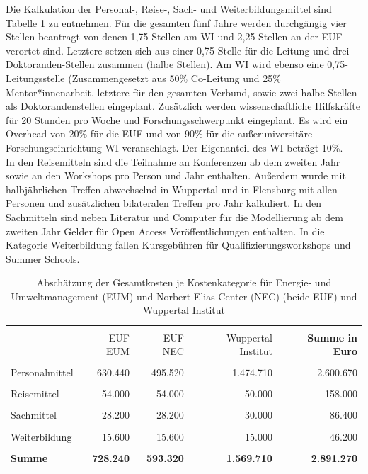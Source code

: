\documentclass[a4paper,11pt,twoside]{scrartcl}
\begin{document}
Die Kalkulation der Personal-, Reise-, Sach- und Weiterbildungsmittel sind Tabelle \ref{tab:kostenkalkulation} zu entnehmen. Für die gesamten fünf Jahre werden durchgängig vier Stellen beantragt von denen 1,75 Stellen am WI und 2,25 Stellen an der EUF verortet sind. Letztere setzen sich aus einer 0,75-Stelle für die Leitung und drei Doktoranden-Stellen zusammen (halbe Stellen). Am WI wird ebenso eine 0,75-Leitungsstelle (Zusammengesetzt aus 50\% Co-Leitung und 25\% Mentor*innenarbeit, letztere für den gesamten Verbund, sowie zwei halbe Stellen als Doktorandenstellen eingeplant. Zusätzlich werden wissenschaftliche Hilfskräfte für 20 Stunden pro Woche und Forschungsschwerpunkt eingeplant. Es wird ein Overhead von 20\% für die EUF und von 90\% für die außeruniversitäre Forschungseinrichtung WI veranschlagt. Der Eigenanteil des WI beträgt 10\%.\\
In den Reisemitteln sind die Teilnahme an Konferenzen ab dem zweiten Jahr sowie an den Workshops pro Person und Jahr enthalten. Außerdem wurde mit halbjährlichen Treffen abwechselnd in Wuppertal und in Flensburg mit allen Personen und zusätzlichen bilateralen Treffen pro Jahr kalkuliert. In den Sachmitteln sind neben Literatur und Computer für die Modellierung ab dem zweiten Jahr Gelder für Open Access Veröffentlichungen enthalten. In die Kategorie Weiterbildung fallen Kursgebühren für Qualifizierungsworkshops und Summer Schools.

\begin{table}[h]
\begin{center}
  \caption{Abschätzung der Gesamtkosten je Kostenkategorie für Energie- und Umweltmanagement (EUM) und Norbert Elias Center (NEC) (beide EUF) und Wuppertal Institut}
\small  
\begin{tabular}[h]{|l | r | r | r | r|}
\hline
&&&&\\
& EUF EUM & EUF NEC & Wuppertal Institut & \textbf{Summe in Euro}\\
\hline
\hline
&&&&\\
 Personalmittel & 630.440 & 495.520 & 1.474.710 & 2.600.670\\
 \hline
 &&&&\\
 Reisemittel & 54.000 & 54.000 & 50.000 & 158.000\\
 \hline
 &&&&\\
 Sachmittel & 28.200 & 28.200 & 30.000 & 86.400\\
 \hline
 &&&&\\
 Weiterbildung & 15.600 & 15.600 & 15.000 & 46.200\\
 \hline
 \hline
 &&&&\\
 \textbf{Summe}& \textbf{728.240} & \textbf{593.320} & \textbf{1.569.710} & \underline{\textbf{2.891.270}}\\
 \hline
 \end{tabular}
 \label{tab:kostenkalkulation}
\end{center}
\end{table}
\end{document}
